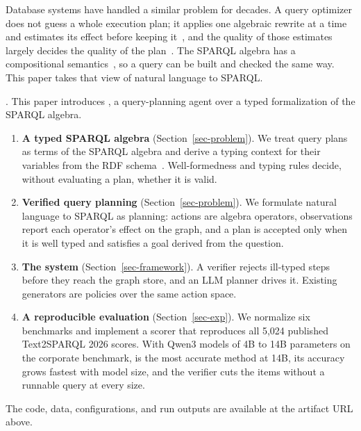 Database systems have handled a similar problem for decades.
A query optimizer does not guess a whole execution plan; it applies one
algebraic rewrite at a time and estimates its effect before keeping
it~\cite{selinger1979access}, and the quality of those estimates
largely decides the quality of the plan~\cite{leis2015good}.
The SPARQL algebra has a compositional semantics~\cite{perez2009semantics,sparql11},
so a query can be built and checked the same way.
This paper takes that view of natural language to SPARQL.

.
This paper introduces \hermes, a query-planning agent over a typed
formalization of the SPARQL algebra.
\begin{enumerate}
\item \textbf{A typed SPARQL algebra} (Section~\ref{sec-problem}).
  We treat query plans as terms of the SPARQL algebra and derive a
  typing context for their variables from the RDF
  schema~\cite{rdfs11}.
  Well-formedness and typing rules decide, without evaluating a plan,
  whether it is valid.
\item \textbf{Verified query planning} (Section~\ref{sec-problem}).
  We formulate natural language to SPARQL as planning: actions are
  algebra operators, observations report each operator's effect on the
  graph, and a plan is accepted only when it is well typed and
  satisfies a goal derived from the question.
\item \textbf{The \hermes system} (Section~\ref{sec-framework}).
  A verifier rejects ill-typed steps before they reach the graph store,
  and an LLM planner drives it.
  Existing generators are policies over the same action space.
\item \textbf{A reproducible evaluation} (Section~\ref{sec-exp}).
  We normalize six benchmarks and implement a scorer that reproduces
  all 5,024 published Text2SPARQL 2026 scores.
  With Qwen3 models of 4B to 14B parameters on the corporate benchmark,
  \hermes is the most accurate method at 14B, its accuracy grows
  fastest with model size, and the verifier cuts the items without a
  runnable query at every size.
\end{enumerate}
The code, data, configurations, and run outputs are available at the
artifact URL above.
